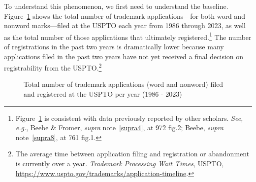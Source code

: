 \documentclass[letterpaper, 11pt, oneside]{article}
\begin{document}
To understand this phenomenon, we first need to understand the baseline. Figure~\ref{fig:1} shows the total number of trademark applications—for both word and nonword marks—filed at the USPTO each year from 1986 through 2023, as well as the total number of those applications that ultimately registered.\footnote{Figure~\ref{fig:1} is consistent with data previously reported by other scholars. \textit{See, e.g.}, Beebe \& Fromer, \textit{supra} note~\ref{supra4}, at 972 fig.2; Beebe, \textit{supra} note~\ref{supra8}, at 761 fig.1.} The number of registrations in the past two years is dramatically lower because many applications filed in the past two years have not yet received a final decision on registrability from the USPTO.\footnote{The average time between application filing and registration or abandonment is currently over a year. \textit{Trademark Processing Wait Times}, USPTO, \url{https://www.uspto.gov/trademarks/application-timeline}.}

\begin{figure}[H]
\centering

\caption{\label{fig:1} Total number of trademark applications (word and nonword) filed and registered at the USPTO per year (1986 - 2023)}
\end{figure}
\end{document}
